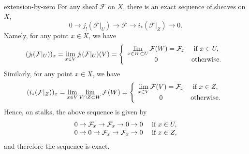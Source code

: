 \begin{example}{extension-by-zero}
    For any sheaf $\mathcal{F}$ on $X$, there is an exact sequence of sheaves on $X$,
    \[ 0 \to j_!(\mathcal{F}|_U) \to \mathcal{F} \to i_*(\mathcal{F}|_Z) \to 0 . \]
    Namely, for any point $x \in X$, we have
    \[ (j_!(\mathcal{F}|_U))_x = \lim_{x \in V} j_!(\mathcal{F}|_U)(V) = \left\{ \begin{array}{cl}
        \lim\limits_{x \in W \subset U} \mathcal{F}(W) = \mathcal{F}_x & \textup{ if } x \in U, \\
        0 & \textup{otherwise} .
    \end{array} \right. \]
    Similarly, for any point $x \in X$, we have
    \[ (i_*(\mathcal{F}|_Z))_x = \lim_{x \in V} \lim_{V \cap Z \subset W} \mathcal{F}(W) = \left\{ \begin{array}{cl}
        \lim\limits_{x \in V} \mathcal{F}(V) = \mathcal{F}_x & \textup{ if } x \in Z, \\
        0 & \textup{otherwise} .
    \end{array} \right. \]
    Hence, on stalks, the above sequence is given by
    \[ \begin{array}{cl}
        0 \to \mathcal{F}_x \to \mathcal{F}_x \to 0 \to 0 & \textup{ if } x \in U , \\
        0 \to 0 \to \mathcal{F}_x \to \mathcal{F}_x \to 0 & \textup{ if } x \in Z ,
    \end{array} \]
    and therefore the sequence is exact.
\end{example}
